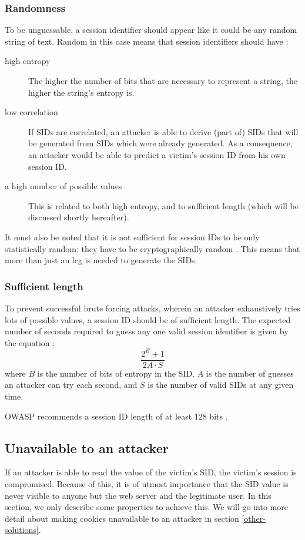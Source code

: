 \subsubsection{Randomness}
To be unguessable, a session identifier should appear like it could be any random string of text. Random in this case means that session identifiers should have \cite{Nikiforakis2010, Farrell2011, rfc4086}:
\begin{description}
	\item[high entropy] The higher the number of bits that are necessary to represent a string, the higher the string's entropy is.
	\item[low correlation] If SIDs are correlated, an attacker is able to derive (part of) SIDs that will be generated from SIDs which were already generated. As a consequence, an attacker would be able to predict a victim's session ID from his own session ID.
	\item[a high number of possible values] This is related to both high entropy, and to sufficient length (which will be discussed shortly hereafter).
\end{description}
It must also be noted that it is not sufficient for session IDs to be only statistically random: they have to be cryptographically random \cite{Fu2001}. This means that more than just an \gls{lcg} %
is needed to generate the SIDs.

\subsubsection{Sufficient length}
To prevent successful brute forcing attacks, wherein an attacker exhaustively tries lots of possible values, a session ID should be of sufficient length. The expected number of seconds required to guess any one valid session identifier is given by the equation \cite{OWASP2009a}:
\[
	\frac{2^B + 1}{2A \cdot S}
\]
where $B$ is the number of bits of entropy in the SID, $A$ is the number of guesses an attacker can try each second, and $S$ is the number of valid SIDs at any given time.

OWASP recommends a session ID length of at least 128 bits \cite{OWASP2009a}.

\subsection{Unavailable to an attacker}
If an attacker is able to read the value of the victim's SID, the victim's session is compromised. Because of this, it is of utmost importance that the SID value is never visible to anyone but the web server and the legitimate user. In this section, we only describe some properties to achieve this. We will go into more detail about making cookies unavailable to an attacker in section \ref{other-solutions}.

